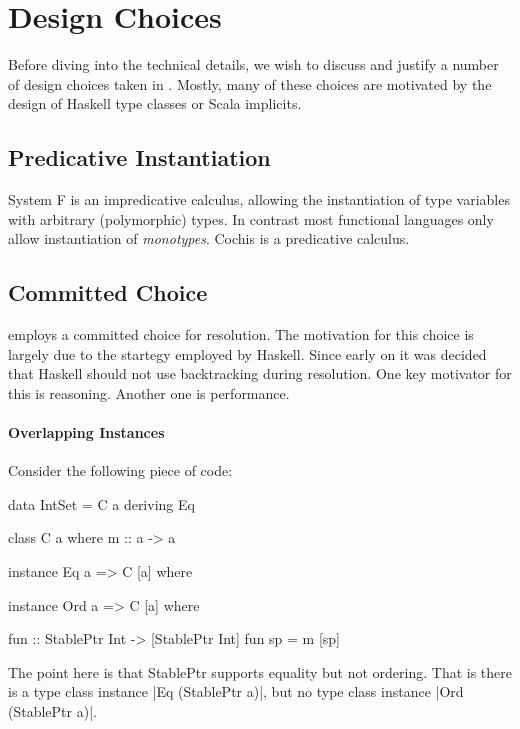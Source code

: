 \section{Design Choices}

Before diving into the technical details, we wish to discuss and justify a number of design 
choices taken in \name. Mostly, many of these choices are motivated by the design of Haskell 
type classes or Scala implicits.



\subsection{Predicative Instantiation}

System F is an impredicative calculus, allowing the instantiation of type variables with 
arbitrary (polymorphic) types. In contrast most functional languages only allow instantiation 
of \emph{monotypes}. Cochis is a predicative calculus. 

\subsection{Committed Choice}

\name employs a committed choice for resolution. The motivation for this choice is 
largely due to the startegy employed by Haskell. Since early on it was decided that Haskell 
should not use backtracking during resolution. One key motivator for this is reasoning. Another 
one is performance.

\paragraph{Overlapping Instances}

Consider the following piece of code:

\begin{code}

data IntSet = C a deriving Eq

class C a where
  m :: a -> a

instance Eq a => C [a] where

instance Ord a => C [a] where

fun :: StablePtr Int -> [StablePtr Int]
fun sp = m [sp]

\end{code}

The point here is that StablePtr supports equality but not ordering. That is there 
is a type class instance |Eq (StablePtr a)|, but no type class instance |Ord (StablePtr a)|. 

